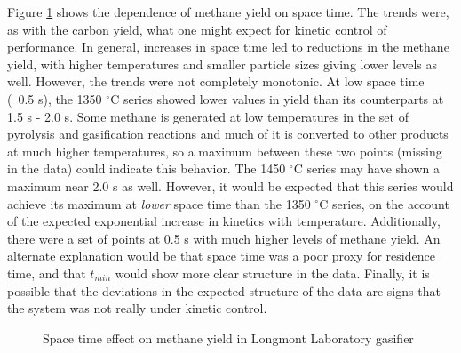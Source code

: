 \documentclass[11pt,twocolumn]{article}
\begin{document}


Figure \ref{fig-Lab-CH4-tau} shows the dependence of methane yield on space time.  The trends were, as with the carbon yield, what one might expect for kinetic control of performance.  In general, increases in space time led to reductions in the methane yield, with higher temperatures and smaller particle sizes giving lower levels as well.  However, the trends were not completely monotonic.  At low space time (~0.5 s), the 1350 $^{\circ}$C series showed lower values in yield than its counterparts at 1.5 s - 2.0 s.  Some methane is generated at low temperatures in the set of pyrolysis and gasification reactions and much of it is converted to other products at much higher temperatures, so a maximum between these two points (missing in the data) could indicate this behavior.  The 1450 $^{\circ}$C series may have shown a maximum near 2.0 s as well.  However, it would be expected that this series would achieve its maximum at \emph{lower} space time than the 1350 $^{\circ}$C series, on the account of the expected exponential increase in kinetics with temperature.  Additionally, there were a set of points at 0.5 s with much higher levels of methane yield.  An alternate explanation would be that space time was a poor proxy for residence time, and that $t_{min}$ would show more clear structure in the data.  Finally, it is possible that the deviations in the expected structure of the data are signs that the system was not really under kinetic control.

\begin{figure}[hbp]

\caption{Space time effect on methane yield in Longmont Laboratory gasifier}
\label{fig-Lab-CH4-tau}
\end{figure}
\end{document}

